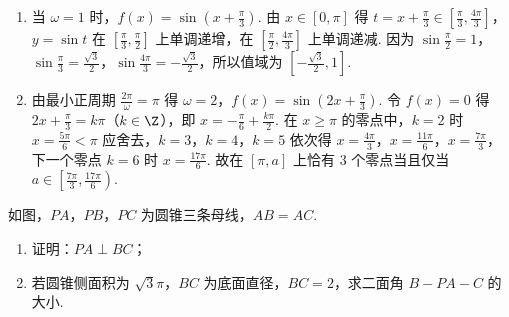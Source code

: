 \begin{solution}
\begin{enumerate}
\item 当 \(\omega=1\) 时，\(f(x)=\sin\left(x+\frac{\pi}{3}\right)\). 由 \(x\in\left[0,\pi\right]\) 得 \(t=x+\frac{\pi}{3}\in\left[\frac{\pi}{3},\frac{4\pi}{3}\right]\)，\(y=\sin t\) 在 \(\left[\frac{\pi}{3},\frac{\pi}{2}\right]\) 上单调递增，在 \(\left[\frac{\pi}{2},\frac{4\pi}{3}\right]\) 上单调递减. 因为 \(\sin\frac{\pi}{2}=1\)，\(\sin\frac{\pi}{3}=\frac{\sqrt3}{2}\)，\(\sin\frac{4\pi}{3}=-\frac{\sqrt3}{2}\)，所以值域为 \(\left[-\frac{\sqrt3}{2},1\right]\).
\item 由最小正周期 \(\frac{2\pi}{\omega}=\pi\) 得 \(\omega=2\)，\(f(x)=\sin\left(2x+\frac{\pi}{3}\right)\). 令 \(f(x)=0\) 得 \(2x+\frac{\pi}{3}=k\pi\)（\(k\in\Z\)），即 \(x=-\frac{\pi}{6}+\frac{k\pi}{2}\). 在 \(x\ge\pi\) 的零点中，\(k=2\) 时 \(x=\frac{5\pi}{6}<\pi\) 应舍去，\(k=3\)，\(k=4\)，\(k=5\) 依次得 \(x=\frac{4\pi}{3}\)，\(x=\frac{11\pi}{6}\)，\(x=\frac{7\pi}{3}\)，下一个零点 \(k=6\) 时 \(x=\frac{17\pi}{6}\). 故在 \(\left[\pi,a\right]\) 上恰有 \(3\) 个零点当且仅当 \(a\in\left[\frac{7\pi}{3},\frac{17\pi}{6}\right)\).
\end{enumerate}
\end{solution}

\begin{problem}
如图，\(PA\)，\(PB\)，\(PC\) 为圆锥三条母线，\(AB=AC\).

\begin{enumerate}
\item 证明：\(PA\perp BC\)；
\item 若圆锥侧面积为 \(\sqrt3\pi\)，\(BC\) 为底面直径，\(BC=2\)，求二面角 \(B-PA-C\) 的大小.
\end{enumerate}

\end{problem}

